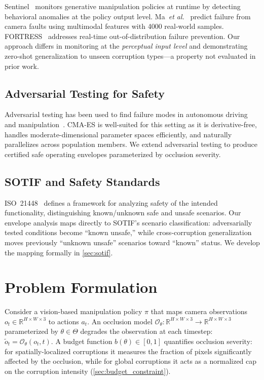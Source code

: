 \documentclass[letterpaper]{IEEEtran}
\newcommand{\etal}{\textit{et al.}}
\begin{document}
Sentinel~\cite{sentinel} monitors generative manipulation policies at runtime by detecting behavioral anomalies at the policy output level.
Ma~\etal~\cite{ma2024} predict failure from camera faults using multimodal features with 4000 real-world samples.
FORTRESS~\cite{fortress} addresses real-time out-of-distribution failure prevention.
Our approach differs in monitoring at the \emph{perceptual input level} and demonstrating zero-shot generalization to unseen corruption types---a property not evaluated in prior work.

\subsection{Adversarial Testing for Safety}

Adversarial testing has been used to find failure modes in autonomous driving~\cite{adv_driving} and manipulation~\cite{adv_manip}.
CMA-ES is well-suited for this setting as it is derivative-free, handles moderate-dimensional parameter spaces efficiently, and naturally parallelizes across population members.
We extend adversarial testing to produce certified safe operating envelopes parameterized by occlusion severity.

\subsection{SOTIF and Safety Standards}

ISO~21448~\cite{iso21448} defines a framework for analyzing safety of the intended functionality, distinguishing known/unknown safe and unsafe scenarios.
Our envelope analysis maps directly to SOTIF's scenario classification: adversarially tested conditions become ``known unsafe,'' while cross-corruption generalization moves previously ``unknown unsafe'' scenarios toward ``known'' status.
We develop the mapping formally in \cref{sec:sotif}.

\section{Problem Formulation}
\label{sec:problem}

Consider a vision-based manipulation policy $\pi$ that maps camera observations $o_t \in \mathbb{R}^{H \times W \times 3}$ to actions $a_t$.
An occlusion model $\mathcal{O}_\theta: \mathbb{R}^{H \times W \times 3} \to \mathbb{R}^{H \times W \times 3}$ parameterized by $\theta \in \Theta$ degrades the observation at each timestep: $\tilde{o}_t = \mathcal{O}_\theta(o_t, t)$.
A budget function $b(\theta) \in [0, 1]$ quantifies occlusion severity: for spatially-localized corruptions it measures the fraction of pixels significantly affected by the occlusion, while for global corruptions it acts as a normalized cap on the corruption intensity (\cref{sec:budget_constraint}).
\end{document}
